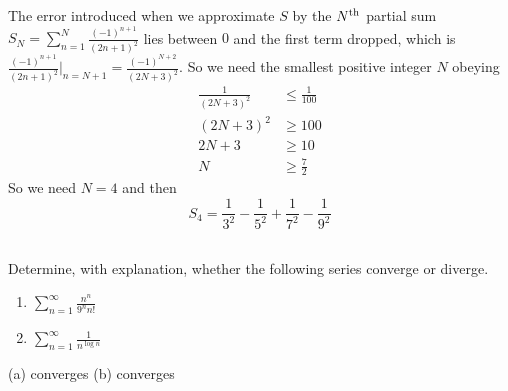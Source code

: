 \begin{solution}
The  error introduced when we approximate $S$ by the $N^{\rm th}$ partial
sum $S_N=\sum_{n=1}^N \frac{(-1)^{n+1}}{(2n+1)^2}$ lies between $0$ and the first term dropped, which is
$\frac{(-1)^{n+1}}{(2n+1)^2}\Big|_{n=N+1}=\frac{(-1)^{N+2}}{(2N+3)^2}$.
So we need the smallest positive integer $N$ obeying
\begin{align*}
\frac{1}{(2N+3)^2} &\le\frac{1}{100}
\\ (2N+3)^2&\ge 100
\\ 2N+3&\ge 10
\\ N&\ge\frac{7}{2}
\end{align*}
So we need  $N=4$ and then
\begin{equation*}
   S_4= \frac{1}{3^2}-\frac{1}{5^2} +\frac{1}{7^2} -\frac{1}{9^2}
\end{equation*}

\end{solution}








\subsection*{\Application}

\begin{question}[M121 2014A]
Determine, with explanation, whether the following series converge or diverge.

\begin{enumerate}
\item[(a)] $\displaystyle\sum_{n=1}^\infty\frac{n^n}{9^n n!}$
\item[(b)] $\displaystyle\sum_{n=1}^\infty\frac{1}{n^{\log n}}$
\end{enumerate}
\end{question}


\begin{answer}
(a) converges
\qquad (b) converges
\end{answer}

